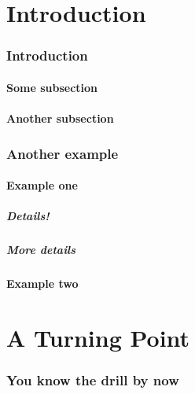 \documentclass[12pt,a4paper]{csum}
\author{Awesome Student}
\begin{document}
\maketitle

\printtoc

\part{Introduction}

    \section{Introduction}
    \lipsum[1-3]
        \subsection{Some subsection}
        \lipsum[4-5]
        \subsection{Another subsection}
        \lipsum[6]
    \section{Another example}
    \lipsum[7]
        \subsection{Example one}
        \lipsum[8-10]
            \subsubsection{Details!}
            \lipsum[11]
            \subsubsection{More details}
            \lipsum[12-16]
        \subsection{Example two}
        \lipsum[17-18]
\part{A Turning Point}
\lipsum[19]
    \section{You know the drill by now}
    \lipsum[20-23]
\end{document}
